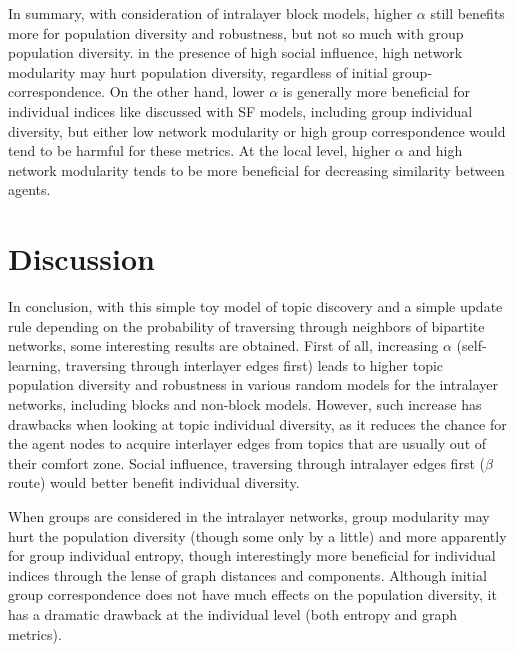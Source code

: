\documentclass{svproc}
\begin{document}
In summary, with consideration of intralayer block models, higher $\alpha$ still benefits more for population diversity and robustness, but not so much with group population diversity. in the presence of high social influence, high network modularity may hurt population diversity, regardless of initial group-correspondence. On the other hand, lower $\alpha$ is generally more beneficial for individual indices like discussed with SF models, including group individual diversity, but either low network modularity or high group correspondence would tend to be harmful for these metrics. At the local level, higher $\alpha$ and high network modularity tends to be more beneficial for decreasing similarity between agents.

\section{Discussion}

In conclusion, with this simple toy model of topic discovery and a simple update rule depending on the probability of traversing through neighbors of bipartite networks, some interesting results are obtained. First of all, increasing $\alpha$ (self-learning, traversing through interlayer edges first) leads to higher topic population diversity and robustness in various random models for the intralayer networks, including blocks and non-block models. However, such increase has drawbacks when looking at topic individual diversity, as it reduces the chance for the agent nodes to acquire interlayer edges from topics that are usually out of their comfort zone. Social influence, traversing through intralayer edges first ($\beta$ route) would better benefit individual diversity.

When groups are considered in the intralayer networks, group modularity may hurt the population diversity (though some only by a little) and more apparently for group individual entropy, though interestingly more beneficial for individual indices through the lense of graph distances and components. Although initial group correspondence does not have much effects on the population diversity, it has a dramatic drawback at the individual level (both entropy and graph metrics).

\end{document}
